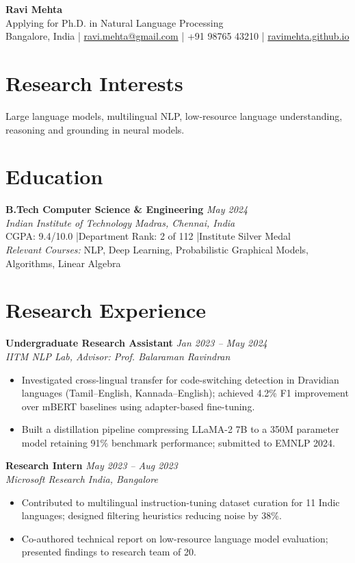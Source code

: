 \documentclass[11pt,a4paper]{article}
\begin{document}
\begin{center}
  {\LARGE \textbf{Ravi Mehta}}\\[4pt]
  Applying for Ph.D. in Natural Language Processing\\[3pt]
  Bangalore, India \quad|\quad
  \href{mailto:ravi.mehta@gmail.com}{ravi.mehta@gmail.com} \quad|\quad
  +91 98765 43210 \quad|\quad
  \href{https://ravimehta.github.io}{ravimehta.github.io}
\end{center}

\section{Research Interests}
Large language models, multilingual NLP, low-resource language understanding, reasoning and grounding in neural models.

\section{Education}
\noindent\textbf{B.Tech Computer Science \& Engineering} \hfill \textit{May 2024}\\
\textit{Indian Institute of Technology Madras, Chennai, India}\\
CGPA: 9.4/10.0 \quad|\quad Department Rank: 2 of 112 \quad|\quad Institute Silver Medal\\
\textit{Relevant Courses:} NLP, Deep Learning, Probabilistic Graphical Models, Algorithms, Linear Algebra

\section{Research Experience}

\noindent\textbf{Undergraduate Research Assistant} \hfill \textit{Jan 2023 -- May 2024}\\
\textit{IITM NLP Lab, Advisor: Prof. Balaraman Ravindran}
\begin{itemize}
  \item Investigated cross-lingual transfer for code-switching detection in Dravidian languages (Tamil--English, Kannada--English); achieved 4.2\% F1 improvement over mBERT baselines using adapter-based fine-tuning.
  \item Built a distillation pipeline compressing LLaMA-2 7B to a 350M parameter model retaining 91\% benchmark performance; submitted to EMNLP 2024.
\end{itemize}

\vspace{4pt}
\noindent\textbf{Research Intern} \hfill \textit{May 2023 -- Aug 2023}\\
\textit{Microsoft Research India, Bangalore}
\begin{itemize}
  \item Contributed to multilingual instruction-tuning dataset curation for 11 Indic languages; designed filtering heuristics reducing noise by 38\%.
  \item Co-authored technical report on low-resource language model evaluation; presented findings to research team of 20.
\end{itemize}
\end{document}
